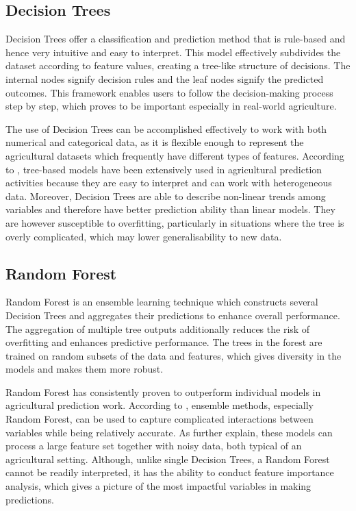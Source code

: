 \subsection{Decision Trees}

Decision Trees offer a classification and prediction method that is rule-based and hence very
intuitive and easy to interpret. This model effectively subdivides the dataset according to feature
values, creating a tree-like structure of decisions. The internal nodes signify decision rules and
the leaf nodes signify the predicted outcomes. This framework enables users to follow the
decision-making process step by step, which proves to be important especially in real-world
agriculture.

The use of Decision Trees can be accomplished effectively to work with both numerical and categorical
data, as it is flexible enough to represent the agricultural datasets which frequently have different
types of features. According to \cite{meghraoui2024applied}, tree-based models have been extensively
used in agricultural prediction activities because they are easy to interpret and can work with
heterogeneous data. Moreover, Decision Trees are able to describe non-linear trends among variables
and therefore have better prediction ability than linear models. They are however susceptible to
overfitting, particularly in situations where the tree is overly complicated, which may lower
generalisability to new data.

\subsection{Random Forest}

Random Forest is an ensemble learning technique which constructs several Decision Trees and
aggregates their predictions to enhance overall performance. The aggregation of multiple tree outputs
additionally reduces the risk of overfitting and enhances predictive performance. The trees in the
forest are trained on random subsets of the data and features, which gives diversity in the models
and makes them more robust.

Random Forest has consistently proven to outperform individual models in agricultural prediction
work. According to \cite{jabed2024crop}, ensemble methods, especially Random Forest, can be used to
capture complicated interactions between variables while being relatively accurate. As
\cite{meghraoui2024applied} further explain, these models can process a large feature set together
with noisy data, both typical of an agricultural setting. Although, unlike single Decision Trees, a
Random Forest cannot be readily interpreted, it has the ability to conduct feature importance
analysis, which gives a picture of the most impactful variables in making predictions.

